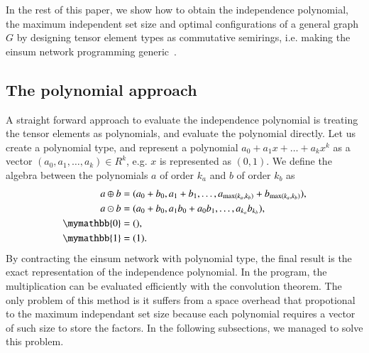 \documentclass{article}
\newcommand{\<}{\langle}
\renewcommand{\>}{\rangle}
\renewcommand{\cite}[1]{{\citep{#1}}}
\theoremstyle{definition}\newtheorem{definition}{\textit{Definition}}
\begin{document}
In the rest of this paper, we show how to obtain the independence polynomial, the maximum independent set size and optimal configurations of a general graph $G$ by designing tensor element types as commutative semirings,
i.e. making the einsum network programming generic~\cite{Stepanov2014}.

\subsection{The polynomial approach}
A straight forward approach to evaluate the independence polynomial is treating the tensor elements as polynomials, and evaluate the polynomial directly.
Let us create a polynomial type, and represent a polynomial $a_0 + a_1 x + \ldots + a_k x^k$ as a vector $(a_0, a_1, \ldots, a_k) \in R^k$, e.g. $x$ is represented as $(0, 1)$.
We define the algebra between the polynomials $a$ of order $k_a$ and $b$ of order $k_b$ as
\begin{align}
    \begin{split}
    a \oplus b &= (a_0 + b_0, a_1 + b_1, \ldots, a_{\max(k_a, k_b)} + b_{\max(k_a, k_b)}),\\
    a \odot b &= (a_0 + b_0, a_1b_0 + a_0b_1, \ldots, a_{k_a} b_{k_b}),\\
    \mymathbb{0} &= (),\\
    \mymathbb{1} &= (1).
    \end{split}
\end{align}
By contracting the einsum network with polynomial type, the final result is the exact representation of the independence polynomial.
In the program, the multiplication can be evaluated efficiently with the convolution theorem.
The only problem of this method is it suffers from a space overhead that propotional to the maximum independant set size because each polynomial requires a vector of such size to store the factors.
In the following subsections, we managed to solve this problem.
\end{document}
